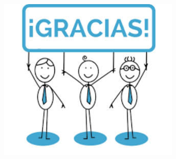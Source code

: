 \documentclass{beamer}
\begin{document}
%
%
%
%
%


\begin{frame}
  \begin{center}
    \includegraphics[height=0.6\textheight,width=0.65\textwidth]{logos/gracias}
  \end{center}
\end{frame}
\end{document}
